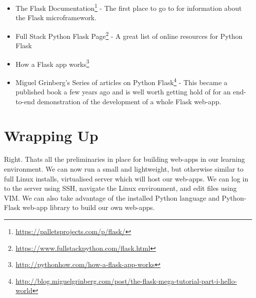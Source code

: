 \documentclass[12pt, a4paper, oneside]{book}
\begin{document}
\begin{itemize}
\item The Flask Documentation\footnote{\url{https://palletsprojects.com/p/flask/}} - The first place to go to for information about the Flask microframework.
\item Full Stack Python Flask Page\footnote{\url{https://www.fullstackpython.com/flask.html}} - A great list of online resources for Python Flask
\item How a Flask app works\footnote{\url{http://pythonhow.com/how-a-flask-app-works}}
\item Miguel Grinberg's Series of articles on Python Flask\footnote{\url{http://blog.miguelgrinberg.com/post/the-flask-mega-tutorial-part-i-hello-world}} - This became a published book a few years ago and is well worth getting hold of for an end-to-end demonstration of the development of a whole Flask web-app. 
\end{itemize}

\section{Wrapping Up}
\label{chapter_02_wrap-up}
\paragraph{} Right. Thats all the preliminaries in place for building web-apps in our learning environment. We can now run a small and lightweight, but otherwise similar to full Linux installs, virtualised server which will host our web-apps. We can log in to the server using SSH, navigate the Linux environment, and edit files using VIM. We can also take advantage of the installed Python language and Python-Flask web-app library to build our own web-apps.
\end{document}
